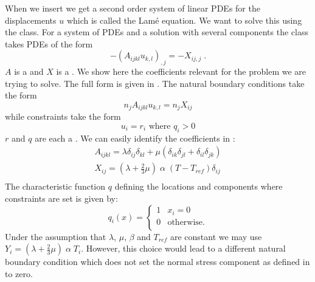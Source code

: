 When we insert  we get a second order system
of linear PDEs for the displacements $u$ which is called the Lam\'e equation.
We want to solve this using the \LinearPDE class.
For a system of PDEs and a solution with several components the \LinearPDE class takes PDEs of the form
\begin{equation}\label{LINEARPDE.SYSTEM.1 TUTORIAL}
-(A_{ijkl} u_{k,l})_{,j}=-X_{ij,j} \; .
\end{equation}
$A$ is a \RankFour and $X$ is a \RankTwo.
We show here the coefficients relevant for the problem we are trying to solve.
The full form is given in .
The natural boundary conditions take the form
\begin{equation}\label{LINEARPDE.SYSTEM.2 TUTORIAL}
n_{j} A_{ijkl} u_{k,l}=n_{j}X_{ij}
\end{equation}
while constraints take the form
\begin{equation}\label{LINEARPDE.SYSTEM.3 TUTORIAL}
u_{i}=r_{i} \mbox{ where } q_{i}>0
\end{equation}
$r$ and $q$ are each a \RankOne.
We can easily identify the coefficients in :
\begin{eqnarray}\label{LINEARPDE ELASTIC COEFFICIENTS}
A_{ijkl}=\lambda \delta_{ij} \delta_{kl} + \mu (
\delta_{ik} \delta_{jl}
+ \delta_{il} \delta_{jk}) \\
X_{ij}=(\lambda+\frac{2}{3} \mu) \;  \alpha \; (T-T_{ref})\delta_{ij} \\
\end{eqnarray}
The characteristic function $q$ defining the locations and components where constraints are set is given by:
\begin{equation}\label{HEATEDBLOCK MASK}
q_{i}(x)=\left\{
\begin{array}{cl}
1 & x_{i}=0\\
0 & \mbox{otherwise.}\\
\end{array}
\right.
\end{equation}
Under the assumption that $\lambda$, $\mu$, $\beta$ and $T_{ref}$
are constant we may use $Y_{i}=(\lambda+\frac{2}{3} \mu) \; \alpha \; T_{i}$.
However, this choice would lead to a different natural boundary condition
which does not set the normal stress component as defined in  to zero.

